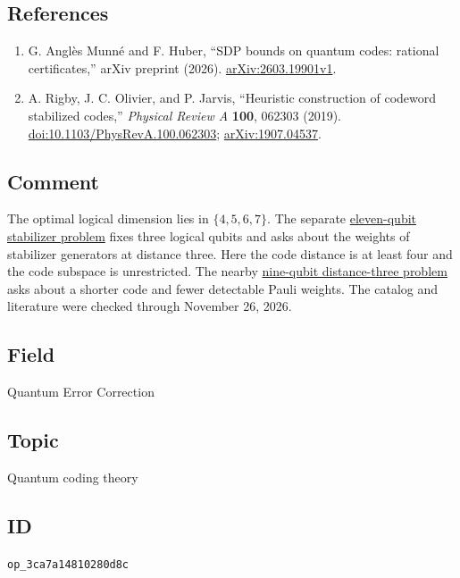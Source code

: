 \subsection*{References}

\begin{enumerate}[label={},leftmargin=4.8em,labelsep=0.5em]
  \footnotesize
  \item[\textup{[AMH26]}]\label{ref:ed4-amh}
  G. Anglès Munné and F. Huber, ``SDP bounds on quantum codes: rational certificates,'' arXiv preprint (2026). \href{https://arxiv.org/abs/2603.19901v1}{arXiv:2603.19901v1}.

  \item[\textup{[ROJ19]}]\label{ref:ed4-roj}
  A. Rigby, J. C. Olivier, and P. Jarvis, ``Heuristic construction of codeword stabilized codes,'' \emph{Physical Review A} \textbf{100}, 062303 (2019). \href{https://doi.org/10.1103/PhysRevA.100.062303}{doi:10.1103/PhysRevA.100.062303}; \href{https://arxiv.org/abs/1907.04537}{arXiv:1907.04537}.
\end{enumerate}

\subsection*{Comment}

The optimal logical dimension lies in $\{4,5,6,7\}$. The separate \href{https://qiqc-op.com/problem/op_458e9e86ccbddccb/}{eleven-qubit stabilizer problem} fixes three logical qubits and asks about the weights of stabilizer generators at distance three. Here the code distance is at least four and the code subspace is unrestricted. The nearby \href{https://qiqc-op.com/problem/op_0d6ac674da115857/}{nine-qubit distance-three problem} asks about a shorter code and fewer detectable Pauli weights. The catalog and literature were checked through November 26, 2026.

\subsection*{Field}

Quantum Error Correction

\subsection*{Topic}

Quantum coding theory

\subsection*{ID}

\texttt{op\_3ca7a14810280d8c}
